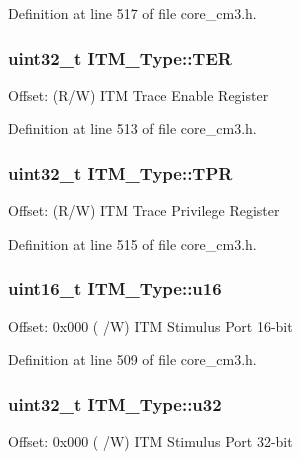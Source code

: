 \-Definition at line 517 of file core\-\_\-cm3.\-h.

\hypertarget{struct_i_t_m___type_a91a040e1b162e1128ac1e852b4a0e589}{
\subsubsection[{\-T\-E\-R}]{ uint32\-\_\-t {\bf \-I\-T\-M\-\_\-\-Type\-::\-T\-E\-R}}}\label{struct_i_t_m___type_a91a040e1b162e1128ac1e852b4a0e589}
\-Offset\-: (\-R/\-W) \-I\-T\-M \-Trace \-Enable \-Register 

\-Definition at line 513 of file core\-\_\-cm3.\-h.

\hypertarget{struct_i_t_m___type_a93b480aac6da620bbb611212186d47fa}{
\subsubsection[{\-T\-P\-R}]{ uint32\-\_\-t {\bf \-I\-T\-M\-\_\-\-Type\-::\-T\-P\-R}}}\label{struct_i_t_m___type_a93b480aac6da620bbb611212186d47fa}
\-Offset\-: (\-R/\-W) \-I\-T\-M \-Trace \-Privilege \-Register 

\-Definition at line 515 of file core\-\_\-cm3.\-h.

\hypertarget{struct_i_t_m___type_a12aa4eb4d9dcb589a5d953c836f4e8f4}{
\subsubsection[{u16}]{ uint16\-\_\-t {\bf \-I\-T\-M\-\_\-\-Type\-::u16}}}\label{struct_i_t_m___type_a12aa4eb4d9dcb589a5d953c836f4e8f4}
\-Offset\-: 0x000 ( /\-W) \-I\-T\-M \-Stimulus \-Port 16-\/bit 

\-Definition at line 509 of file core\-\_\-cm3.\-h.

\hypertarget{struct_i_t_m___type_a6882fa5af67ef5c5dfb433b3b68939df}{
\subsubsection[{u32}]{ uint32\-\_\-t {\bf \-I\-T\-M\-\_\-\-Type\-::u32}}}\label{struct_i_t_m___type_a6882fa5af67ef5c5dfb433b3b68939df}
\-Offset\-: 0x000 ( /\-W) \-I\-T\-M \-Stimulus \-Port 32-\/bit 

